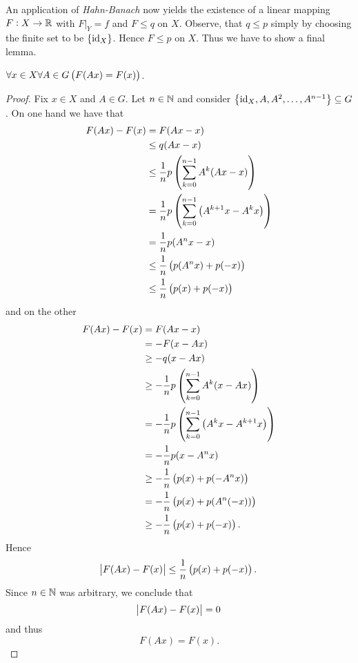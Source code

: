 \begin{enumerate}[label = \textbf{Exercise \arabic*.},wide = 0pt, itemsep = 1.5ex]
		An application of \emph{Hahn-Banach} now yields the existence of a linear mapping $F : X \to \mathbb{R}$ with $F\vert_Y = f$ and $F \leq q$ on $X$. Observe, that $q \leq p$ simply by choosing the finite set to be $\cbr{\id_X}$. Hence $F \leq p$ on $X$. Thus we have to show a final lemma.

		\begin{lemma}
			$\forall x \in X\forall A \in G\del[1]{F(Ax) = F(x)}$.
		\end{lemma}

		\begin{proof}
			Fix $x \in X$ and $A \in G$. Let $n \in \mathbb{N}$ and consider $\cbr{\id_X,A,A^2,\dots,A^{n-1}} \subseteq G$. On one hand we have that 
			\begin{align*}
				F(Ax) - F(x) &= F(Ax - x)\\
				&\leq q(Ax - x)\\
				&\leq \frac{1}{n} p\del{\sum_{k = 0}^{n - 1} A^k(Ax - x)}\\
				&= \frac{1}{n} p\del{\sum_{k = 0}^{n - 1} \del[1]{A^{k+1}x - A^kx}}\\
				&= \frac{1}{n}p(A^nx - x)\\
				&\leq \frac{1}{n}\del{p(A^nx) + p(-x)}\\
				&\leq \frac{1}{n}\del{p(x) + p(-x)}
			\end{align*}
			\noindent and on the other
			\begin{align*}
				F(Ax) - F(x) &= F(Ax - x)\\
				&= -F(x - Ax)\\
				&\geq -q(x - Ax)\\
				&\geq -\frac{1}{n} p\del{\sum_{k = 0}^{n - 1} A^k(x - Ax)}\\
				&= -\frac{1}{n} p\del{\sum_{k = 0}^{n - 1} \del[1]{A^kx - A^{k+1}x}}\\
				&= -\frac{1}{n}p(x - A^nx)\\
				&\geq -\frac{1}{n}\del{p(x) + p(-A^nx)}\\
				&= -\frac{1}{n} \del{p(x) + p(A^n(-x))}\\
				&\geq -\frac{1}{n}\del{p(x) + p(-x)}.
			\end{align*}
			Hence
			\begin{equation*}
				\abs{F(Ax) - F(x)} \leq \frac{1}{n}\del{p(x) + p(-x)}.
			\end{equation*}
			Since $n \in \mathbb{N}$ was arbitrary, we conclude that
			\begin{equation*}
				\abs{F(Ax) - F(x)} = 0
			\end{equation*}
			\noindent and thus
			\begin{equation*}
				F(Ax) = F(x).
			\end{equation*}
		\end{proof}


\end{enumerate}
